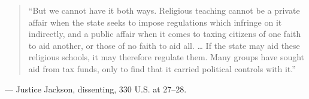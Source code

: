 \documentclass[12pt]{article}
\begin{document}
\begin{quote}
``But we cannot have it both ways. Religious teaching cannot be a private affair when the state seeks to impose regulations which infringe on it indirectly, and a public affair when it comes to taxing citizens of one faith to aid another, or those of no faith to aid all. \ldots{} If the state may aid these religious schools, it may therefore regulate them. Many groups have sought aid from tax funds, only to find that it carried political controls with it.''
\end{quote}
\noindent --- Justice Jackson, dissenting, 330 U.S. at 27--28.
\end{document}
